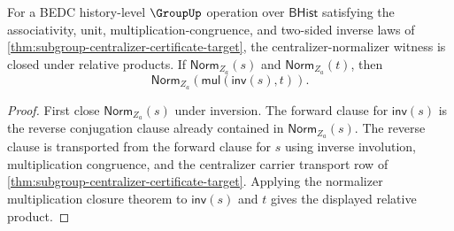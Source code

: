\begin{theorem}
\label{thm:subgroup-centralizer-normalizer-relative-product-closed-from-empty-unit}
For a BEDC history-level $\GroupUp$ operation over $\mathsf{BHist}$
satisfying the associativity, unit, multiplication-congruence, and two-sided
inverse laws of \autoref{thm:subgroup-centralizer-certificate-target}, the
centralizer-normalizer witness is closed under relative products. If
$\mathsf{Norm}_{Z_a}(s)$ and $\mathsf{Norm}_{Z_a}(t)$, then
$$
\mathsf{Norm}_{Z_a}(\mathsf{mul}(\mathsf{inv}(s),t)).
$$
\end{theorem}
\begin{proof}
First close $\mathsf{Norm}_{Z_a}(s)$ under inversion. The forward clause for
$\mathsf{inv}(s)$ is the reverse conjugation clause already contained in
$\mathsf{Norm}_{Z_a}(s)$. The reverse clause is transported from the forward
clause for $s$ using inverse involution, multiplication congruence, and the
centralizer carrier transport row of
\autoref{thm:subgroup-centralizer-certificate-target}. Applying the
normalizer multiplication closure theorem to $\mathsf{inv}(s)$ and $t$ gives
the displayed relative product.
\end{proof}

